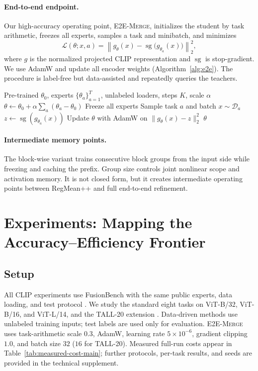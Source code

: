 \documentclass[letterpaper]{article} %
\newcommand{\method}{\textup{\textsc{E2E-Merge}}\xspace}
\theoremstyle{plain}
\theoremstyle{definition}
\begin{document}
\paragraph{End-to-end endpoint.}
Our high-accuracy operating point, \method, initializes the student by task arithmetic, freezes all experts, samples a task and minibatch, and minimizes
\begin{equation}
\mathcal L(\theta;x,a)=
\left\|g_\theta(x)-\operatorname{sg}\!\bigl(g_{\theta_a}(x)\bigr)\right\|_2^2,
\label{eq:method-loss}
\end{equation}
where $g$ is the normalized projected CLIP representation and $\operatorname{sg}$ is stop-gradient.
We use AdamW and update all encoder weights (Algorithm~\ref{alg:e2e}).
The procedure is label-free but data-assisted and repeatedly queries the teachers.

\begin{algorithm}[tb]
\caption{End-to-end representation distillation (\method)}
\label{alg:e2e}
\begin{algorithmic}[1]
\REQUIRE Pre-trained $\theta_0$, experts $\{\theta_a\}_{a=1}^T$, unlabeled loaders,
steps $K$, scale $\alpha$
\STATE $\theta\leftarrow\theta_0+\alpha\sum_a(\theta_a-\theta_0)$
\STATE Freeze all experts
    \STATE Sample task $a$ and batch $x\sim\mathcal D_a$
    \STATE $z\leftarrow\operatorname{sg}(g_{\theta_a}(x))$
    \STATE Update $\theta$ with AdamW on $\|g_\theta(x)-z\|_2^2$
\ENDFOR
\RETURN $\theta$
\end{algorithmic}
\end{algorithm}

\paragraph{Intermediate memory points.}
The block-wise variant trains consecutive block groups from the input side while freezing and caching the prefix.
Group size controls joint nonlinear scope and activation memory.
It is not closed form, but it creates intermediate operating points between RegMean++ and full end-to-end refinement.

\section{Experiments: Mapping the Accuracy--Efficiency Frontier}
\label{sec:experiments}

\subsection{Setup}
All CLIP experiments use FusionBench with the same public experts, data loading, and test protocol \citep{tang2024fusionbench}.
We study the standard eight tasks on ViT-B/32, ViT-B/16, and ViT-L/14, and the TALL-20 extension \citep{ilharco2023taskarithmetic,wang2024tall}.
Data-driven methods use unlabeled training inputs; test labels are used only for evaluation.
\method uses task-arithmetic scale $0.3$, AdamW, learning rate $5\times10^{-6}$, gradient clipping $1.0$, and batch size $32$ ($16$ for TALL-20).
Measured full-run costs appear in Table~\ref{tab:measured-cost-main}; further protocols, per-task results, and seeds are provided in the technical supplement.
\end{document}
